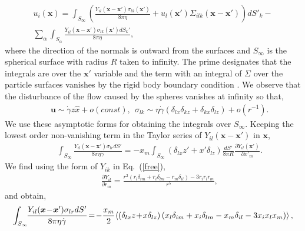 \begin{equation} \begin{aligned}  %
u_i(\bm x)\!=\!\!\int_{S_{\infty}}\!\!\!\left(\frac{Y_{il}(\bm x\!-\!\bm x')\sigma_{lk}(\bm x')}{8\pi \eta}\!+\!u_l(\bm x')\Sigma_{ilk}(\bm x\!-\!\bm x')\right) dS'_k
\!- \\ \sum_{\alpha}\int_{S_{\alpha}}\!\!\!\frac{Y_{il}(\bm x-\bm x')\sigma_{lk}(\bm x')dS_k'}{8\pi \eta},\label{in}
\end{aligned} \end{equation}
where the direction of the normals is outward from the surfaces and $S_{\infty}$ is the spherical surface with radius $R$ taken to infinity. The prime designates that the integrals are over the $\bm x'$ variable and the term with an integral of $\Sigma$ over the particle surfaces vanishes by the rigid body boundary condition \citep{kim_karrila,ps,Fouxon_2017}. We observe that the disturbance of the flow caused by the spheres vanishes at infinity so that,
\begin{eqnarray}&&\!\!\!\!\!\!\!\!\!\!\!\!\!\!\!\!
\bm u\!\sim\! \dot{\gamma} z{\hat x}\!+\!o(const),\ \ \sigma_{lk}\!\sim\! \eta\dot{\gamma}(\delta_{lx}\delta_{kz}\!+\!\delta_{kx}\delta_{lz})\!+\!o(r^{-1}). \nonumber
\end{eqnarray}
We use these asymptotic forms for obtaining the integrals over $S_{\infty}$. Keeping the lowest order non-vanishing term in the Taylor series of $Y_{il}(\bm x-\bm x')$ in $\bm x$,
\begin{eqnarray}&&\!\!\!\!\!\!\!\!\!\!\!\!
\int_{S_{\infty}}\!\!\frac{Y_{il}(\bm x\!-\!\bm x')\sigma_{lr}dS'}{8\pi \eta \dot{\gamma}}\!=-\!x_m\!\int_{S_{\infty}}\!\!(\delta_{lx}z'\!+\!x'\delta_{lz})
\frac{dS'}{8\pi R} \frac{\partial Y_{il}(\bm x')}{\partial x'_m}.\nonumber
\end{eqnarray}
We find using the form of $Y_{ik}$ in Eq.~(\ref{free}),
\begin{eqnarray}&&\!\!\!\!\!\!\!\!\!\!\!\!\!\!
\frac{\partial Y_{il}}{\partial r_m}=\frac{r^2(r_l\delta_{im}+r_i\delta_{lm}-r_m\delta_{il})-3r_ir_lr_m}{r^5},
\end{eqnarray}
and obtain,
\begin{equation} %
  \small
\int_{S_{\infty}}\!\!\frac{Y_{il}(\bm x\!-\!\bm x')\sigma_{lr}dS'}{8\pi \eta \dot{\gamma}}\!=\!-\frac{x_m}{2}\!\left\langle (\delta_{lx}z\!+\!x\delta_{lz})
\left(x_l\delta_{im}+x_i\delta_{lm}-x_m\delta_{il}-3x_ix_lx_m\right)\right\rangle,
\end{equation}
